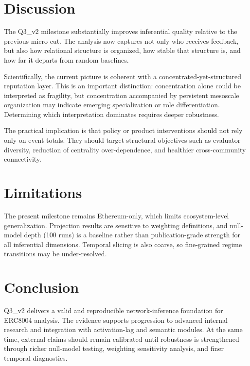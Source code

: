 \documentclass[11pt,a4paper]{article}
\begin{document}
\section{Discussion}
The Q3\_v2 milestone substantially improves inferential quality relative to the previous micro cut. The analysis now captures not only who receives feedback, but also how relational structure is organized, how stable that structure is, and how far it departs from random baselines.

Scientifically, the current picture is coherent with a concentrated-yet-structured reputation layer. This is an important distinction: concentration alone could be interpreted as fragility, but concentration accompanied by persistent mesoscale organization may indicate emerging specialization or role differentiation. Determining which interpretation dominates requires deeper robustness.

The practical implication is that policy or product interventions should not rely only on event totals. They should target structural objectives such as evaluator diversity, reduction of centrality over-dependence, and healthier cross-community connectivity.

\section{Limitations}
The present milestone remains Ethereum-only, which limits ecosystem-level generalization. Projection results are sensitive to weighting definitions, and null-model depth (100 runs) is a baseline rather than publication-grade strength for all inferential dimensions. Temporal slicing is also coarse, so fine-grained regime transitions may be under-resolved.

\section{Conclusion}
Q3\_v2 delivers a valid and reproducible network-inference foundation for ERC8004 analysis. The evidence supports progression to advanced internal research and integration with activation-lag and semantic modules. At the same time, external claims should remain calibrated until robustness is strengthened through richer null-model testing, weighting sensitivity analysis, and finer temporal diagnostics.
\end{document}
